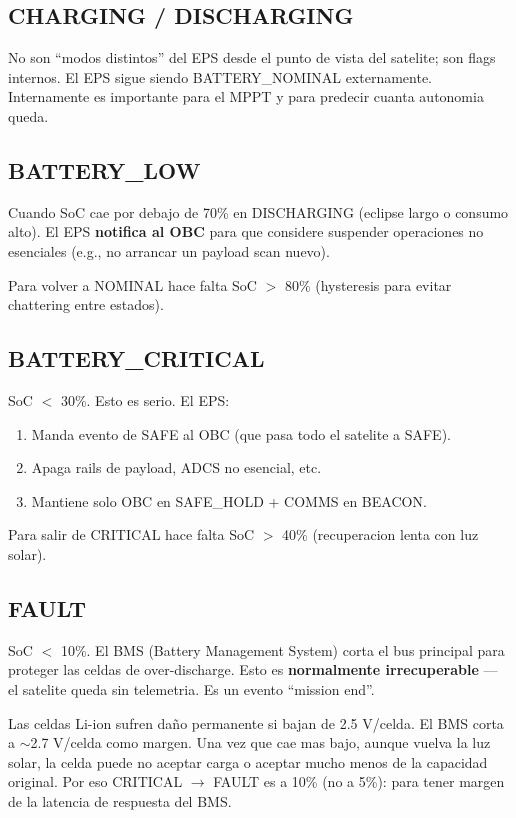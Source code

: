 \documentclass[11pt,a4paper,oneside,openright]{book}
\begin{document}
\subsection*{CHARGING / DISCHARGING}

No son ``modos distintos'' del EPS desde el punto de vista del
satelite; son flags internos. El EPS sigue siendo BATTERY\_NOMINAL
externamente. Internamente es importante para el MPPT y para
predecir cuanta autonomia queda.

\subsection*{BATTERY\_LOW}

Cuando SoC cae por debajo de 70\% en DISCHARGING (eclipse largo o
consumo alto). El EPS \textbf{notifica al OBC} para que considere
suspender operaciones no esenciales (e.g., no arrancar un payload
scan nuevo).

Para volver a NOMINAL hace falta SoC $>$ 80\% (hysteresis para evitar
chattering entre estados).

\subsection*{BATTERY\_CRITICAL}

SoC $<$ 30\%. Esto es serio. El EPS:

\begin{enumerate}[leftmargin=2em]
  \item Manda evento de SAFE al OBC (que pasa todo el satelite a SAFE).
  \item Apaga rails de payload, ADCS no esencial, etc.
  \item Mantiene solo OBC en SAFE\_HOLD + COMMS en BEACON.
\end{enumerate}

Para salir de CRITICAL hace falta SoC $>$ 40\% (recuperacion lenta
con luz solar).

\subsection*{FAULT}

SoC $<$ 10\%. El BMS (Battery Management System) corta el bus
principal para proteger las celdas de over-discharge. Esto es
\textbf{normalmente irrecuperable} --- el satelite queda sin
telemetria. Es un evento ``mission end''.

\begin{cuidado}
Las celdas Li-ion sufren daño permanente si bajan de 2.5 V/celda.
El BMS corta a $\sim$2.7 V/celda como margen. Una vez que cae mas
bajo, aunque vuelva la luz solar, la celda puede no aceptar carga
o aceptar mucho menos de la capacidad original. Por eso CRITICAL
$\to$ FAULT es a 10\% (no a 5\%): para tener margen de la latencia
de respuesta del BMS.
\end{cuidado}
\end{document}
